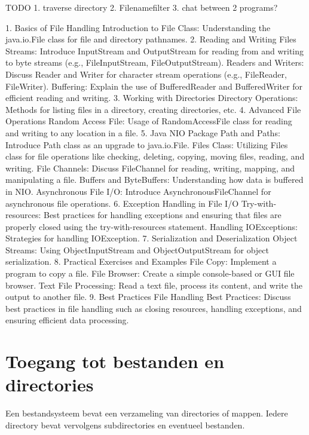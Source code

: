 TODO 1.  traverse directory
2. Filenamefilter
3. chat between 2 programs?

1. Basics of File Handling
Introduction to File Class: Understanding the java.io.File class for file and directory pathnames.
2. Reading and Writing Files
Streams: Introduce InputStream and OutputStream for reading from and writing to byte streams (e.g., FileInputStream, FileOutputStream).
Readers and Writers: Discuss Reader and Writer for character stream operations (e.g., FileReader, FileWriter).
Buffering: Explain the use of BufferedReader and BufferedWriter for efficient reading and writing.
3. Working with Directories
Directory Operations: Methods for listing files in a directory, creating directories, etc.
4. Advanced File Operations
Random Access File: Usage of RandomAccessFile class for reading and writing to any location in a file.
5. Java NIO Package
Path and Paths: Introduce Path class as an upgrade to java.io.File.
Files Class: Utilizing Files class for file operations like checking, deleting, copying, moving files, reading, and writing.
File Channels: Discuss FileChannel for reading, writing, mapping, and manipulating a file.
Buffers and ByteBuffers: Understanding how data is buffered in NIO.
Asynchronous File I/O: Introduce AsynchronousFileChannel for asynchronous file operations.
6. Exception Handling in File I/O
Try-with-resources: Best practices for handling exceptions and ensuring that files are properly closed using the try-with-resources statement.
Handling IOExceptions: Strategies for handling IOException.
7. Serialization and Deserialization
Object Streams: Using ObjectInputStream and ObjectOutputStream for object serialization.
8. Practical Exercises and Examples
File Copy: Implement a program to copy a file.
File Browser: Create a simple console-based or GUI file browser.
Text File Processing: Read a text file, process its content, and write the output to another file.
9. Best Practices
File Handling Best Practices: Discuss best practices in file handling such as closing resources, handling exceptions, and ensuring efficient data processing.


 
 \section{Toegang tot bestanden en directories}
 
Een bestandsysteem bevat een verzameling van directories of mappen. Iedere directory bevat vervolgens subdirectories en eventueel bestanden.

